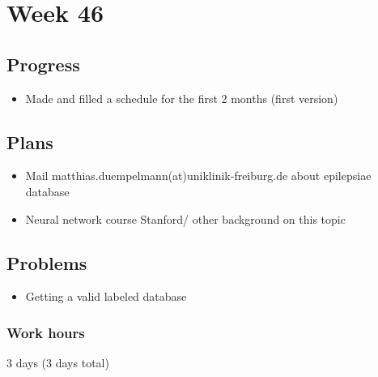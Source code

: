 \section*{Week 46}
    \subsection*{Progress}
        \begin{itemize}
            \item Made and filled a schedule for the first 2 months (first version)
        \end{itemize}
        
    \subsection*{Plans}
        \begin{itemize}
            \item Mail matthias.duempelmann(at)uniklinik-freiburg.de about epilepsiae database
            \item Neural network course Stanford/ other background on this topic
        \end{itemize}
    
    \subsection*{Problems}
        \begin{itemize}
            \item Getting a valid labeled database
        \end{itemize}
        
    \subsubsection*{Work hours}
        3 days (3 days total)